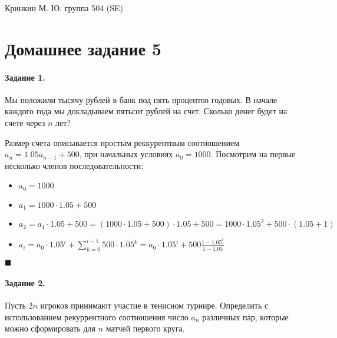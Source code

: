 \documentclass[a4paper,12pt]{article}
\begin{document}
\sloppy

\lstset{
	basicstyle=\small,
	stringstyle=\ttfamily,
	showstringspaces=false,
	columns=fixed,
	breaklines=true,
	numbers=right,
	numberstyle=\tiny
}

\newtheorem{Def}{Определение}[section]
\newtheorem{Th}{Теорема}
\newtheorem{Lem}[Th]{Лемма}
\newenvironment{Proof}
	{\par\noindent{\bf Доказательство.}}
	{\hfill$\scriptstyle\blacksquare$}
\newenvironment{Solution}
	{\par\noindent{\bf Решение.}}
	{\hfill$\scriptstyle\blacksquare$}


\begin{flushright}
	Кринкин М. Ю. группа 504 (SE)
\end{flushright}

\section{Домашнее задание 5}

\paragraph{Задание 1.} Мы положили тысячу рублей в банк под пять процентов годовых. В начале каждого года мы докладываем пятьсот рублей на счет. Сколько денег будет на счете через $n$ лет?

\begin{Solution}
Размер счета описывается простым реккурентным соотношением $a_n = 1.05 a_{n-1} + 500$, при начальных условиях $a_0 = 1000$. Посмотрим на первые несколько членов последовательности:
\begin{itemize}
\item $a_0 = 1000$

\item $a_1 = 1000 \cdot 1.05 + 500$

\item $a_2 = a_1 \cdot 1.05 + 500 = \left(1000\cdot 1.05 + 500\right) \cdot 1.05 + 500 = 1000 \cdot 1.05^2 + 500 \cdot \left(1.05 + 1\right)$

\item $a_i = a_0 \cdot 1.05^i + \sum_{k=0}^{i-1} 500 \cdot 1.05^k= a_0 \cdot 1.05^i + 500 \frac{1-1.05^{i}}{1-1.05}$

\end{itemize}
\end{Solution}

\paragraph{Задание 2.} Пусть $2n$ игроков принимают участие в тенисном турнире. Определить с использованием рекуррентного соотношения число $a_n$ различных пар, которые можно сформировать для $n$ матчей первого круга.
\end{document}
